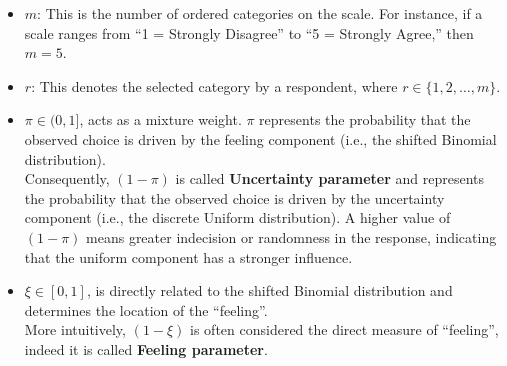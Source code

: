 \documentclass[
  letterpaper,
  DIV=11,
  numbers=noendperiod]{scrartcl}
\begin{document}
\begin{itemize}
\item
  \(m\): This is the number of ordered categories on the scale. For
  instance, if a scale ranges from ``1 = Strongly Disagree'' to ``5 =
  Strongly Agree,'' then \(m=5\).
\item
  \(r\): This denotes the selected category by a respondent, where
  \(r\in \{ 1,2,…,m\}\).
\item
  \(\pi \in (0,1]\), acts as a mixture weight. \(\pi\) represents the
  probability that the observed choice is driven by the feeling
  component (i.e., the shifted Binomial distribution).\\
  Consequently, \((1−\pi)\) is called \textbf{Uncertainty parameter} and
  represents the probability that the observed choice is driven by the
  uncertainty component (i.e., the discrete Uniform distribution). A
  higher value of \((1−\pi)\) means greater indecision or randomness in
  the response, indicating that the uniform component has a stronger
  influence.
\item
  \(\xi \in [0,1]\), is directly related to the shifted Binomial
  distribution and determines the location of the ``feeling''.\\
  More intuitively, \((1−\xi)\) is often considered the direct measure
  of ``feeling'', indeed it is called \textbf{Feeling parameter}.


\end{itemize}
\end{document}
